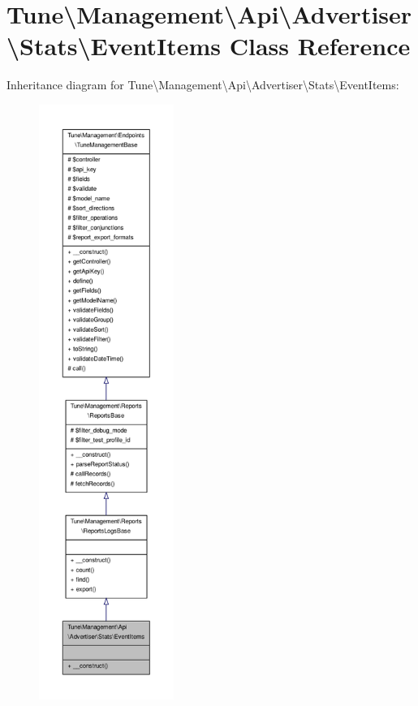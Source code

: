 \hypertarget{classTune_1_1Management_1_1Api_1_1Advertiser_1_1Stats_1_1EventItems}{\section{Tune\textbackslash{}Management\textbackslash{}Api\textbackslash{}Advertiser\textbackslash{}Stats\textbackslash{}Event\-Items Class Reference}
\label{classTune_1_1Management_1_1Api_1_1Advertiser_1_1Stats_1_1EventItems}
}


Inheritance diagram for Tune\textbackslash{}Management\textbackslash{}Api\textbackslash{}Advertiser\textbackslash{}Stats\textbackslash{}Event\-Items\-:
\nopagebreak
\begin{figure}[H]
\begin{center}
\leavevmode
\includegraphics[height=550pt]{classTune_1_1Management_1_1Api_1_1Advertiser_1_1Stats_1_1EventItems__inherit__graph}
\end{center}
\end{figure}


